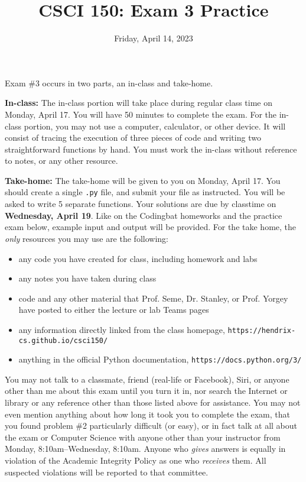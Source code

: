 \documentclass{article}
\newcommand{\vs}{\vspace{0.1in}}
\begin{document}
\title{CSCI 150: Exam 3 Practice}
\date{Friday, April 14, 2023}

\maketitle

  Exam \#3 occurs in two parts, an in-class and take-home.

\vs

\vs

\textbf{In-class:} The in-class portion will take place during regular class time on Monday, April 17. You will have 50 minutes to complete the exam. For the in-class portion, you may not use a computer, calculator, or other device. It will consist of tracing the execution of three pieces of code and writing two straightforward functions by hand. You must work the in-class without reference to notes, or any other resource.

\vs

\textbf{Take-home:} The take-home will be given to you on Monday, April 17. You should create a single \texttt{.py} file, and submit your file as instructed. You will be asked to write 5 separate functions. Your solutions are due by classtime on \textbf{Wednesday, April 19}.  Like on the Codingbat homeworks and the practice exam below, example input and output will be provided. For the take home, the \emph{only} resources you may use are the following:
\begin{itemize}
  \item  any code you have created for class, including homework and labs
  \item  any notes you have taken during class
  \item  code and any other material that Prof. Seme, Dr. Stanley,
    or Prof. Yorgey have posted to either the lecture or lab Teams pages
  \item  any information directly linked from the class homepage, \texttt{https://hendrix-cs.github.io/csci150/}
  \item  anything in the official Python documentation, \texttt{https://docs.python.org/3/}
\end{itemize}

 You may not talk to a classmate, friend (real-life or Facebook), Siri, or anyone other than me about this exam until you turn it in, nor search the Internet or library or any reference other than those listed above for assistance.  You may not even mention anything about how long it took you to complete the exam, that you found problem \#2 particularly difficult (or easy), or in fact talk at all about the exam or Computer Science with anyone other than your instructor from Monday, 8:10am--Wednesday, 8:10am.  Anyone who \emph{gives} answers is equally in violation of the Academic Integrity Policy as one who \emph{receives} them. All suspected violations will be reported to that committee.
\end{document}
